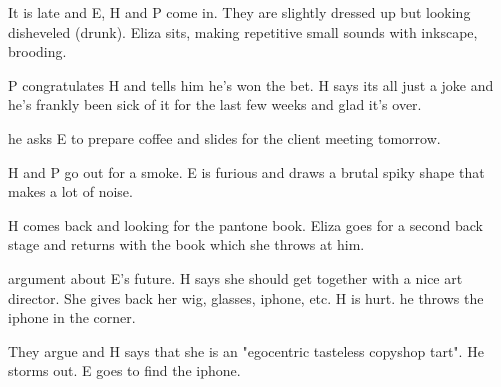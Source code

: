 \act


It is late and E, H and P come in.  They are slightly dressed up but looking disheveled (drunk).  Eliza sits, making repetitive small sounds with inkscape, brooding.

P congratulates H and tells him he's won the bet.  H says its all just a joke and he's frankly been sick of it for the last few weeks and glad it's over.

he asks E to prepare coffee and slides for the client meeting tomorrow.

H and P go out for a smoke.  E is furious and draws a brutal spiky shape that makes a lot of noise.

H comes back and looking for the pantone book.  Eliza goes for a second back stage and returns with the book which she throws at him.

argument about E's future.  H says she should get together with a nice art director.  She gives back her wig, glasses, iphone, etc.  H is hurt.  he throws the iphone in the corner.

They argue and H says that she is an "egocentric tasteless copyshop tart".  He storms out.  E goes to find the iphone.


